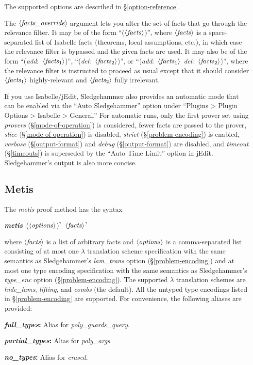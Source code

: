 \documentclass[a4paper,12pt]{article}
\def\qty#1{\ensuremath{\left<\mathit{#1\/}\right>}}
\begin{document}
The supported options are described in \S\ref{option-reference}.

The \qty{facts\_override} argument lets you alter the set of facts that go
through the relevance filter. It may be of the form ``(\qty{facts})'', where
\qty{facts} is a space-separated list of Isabelle facts (theorems, local
assumptions, etc.), in which case the relevance filter is bypassed and the given
facts are used. It may also be of the form ``(\textit{add}:\ \qty{facts\/_{\mathrm{1}}})'',
``(\textit{del}:\ \qty{facts\/_{\mathrm{2}}})'', or ``(\textit{add}:\ \qty{facts\/_{\mathrm{1}}}\
\textit{del}:\ \qty{facts\/_{\mathrm{2}}})'', where the relevance filter is instructed to
proceed as usual except that it should consider \qty{facts\/_{\mathrm{1}}}
highly-relevant and \qty{facts\/_{\mathrm{2}}} fully irrelevant.

If you use Isabelle/jEdit, Sledgehammer also provides an automatic mode that can
be enabled via the ``Auto Sledgehammer'' option under ``Plugins > Plugin Options
> Isabelle > General.'' For automatic runs, only the first prover set using
\textit{provers} (\S\ref{mode-of-operation}) is considered, fewer facts are
passed to the prover, \textit{slice} (\S\ref{mode-of-operation}) is disabled,
\textit{strict} (\S\ref{problem-encoding}) is enabled, \textit{verbose}
(\S\ref{output-format}) and \textit{debug} (\S\ref{output-format}) are disabled,
and \textit{timeout} (\S\ref{timeouts}) is superseded by the ``Auto Time Limit''
option in jEdit. Sledgehammer's output is also more concise.

\subsection{Metis}

The \textit{metis} proof method has the syntax

\prew
\textbf{\textit{metis}}~(\qty{options})${}^?$~\qty{facts}${}^?$
\postw

where \qty{facts} is a list of arbitrary facts and \qty{options} is a
comma-separated list consisting of at most one $\lambda$ translation scheme
specification with the same semantics as Sledgehammer's \textit{lam\_trans}
option (\S\ref{problem-encoding}) and at most one type encoding specification
with the same semantics as Sledgehammer's \textit{type\_enc} option
(\S\ref{problem-encoding}).
%
The supported $\lambda$ translation schemes are \textit{hide\_lams},
\textit{lifting}, and \textit{combs} (the default).
%
All the untyped type encodings listed in \S\ref{problem-encoding} are supported.
For convenience, the following aliases are provided:
\begin{enum}
\item[\labelitemi] \textbf{\textit{full\_types}:} Alias for \textit{poly\_guards\_query}.
\item[\labelitemi] \textbf{\textit{partial\_types}:} Alias for \textit{poly\_args}.
\item[\labelitemi] \textbf{\textit{no\_types}:} Alias for \textit{erased}.
\end{enum}
\end{document}
